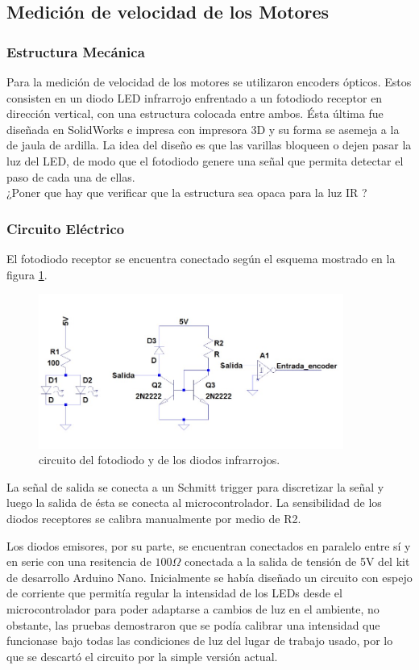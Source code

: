 \documentclass[10pt,conference,a4paper,onecolumn]{article}%
\begin{document}
\subsection{Medición de velocidad de los Motores}
\subsubsection{Estructura Mecánica}
Para la medición de velocidad de los motores se utilizaron encoders ópticos. Estos consisten en un diodo LED infrarrojo enfrentado a un fotodiodo receptor en dirección vertical, con una estructura colocada entre ambos. Ésta última fue diseñada en SolidWorks e impresa con impresora 3D y su forma se asemeja a la de jaula de ardilla. La idea del diseño es que las varillas bloqueen o dejen pasar la luz del LED, de modo que el fotodiodo genere una señal que permita detectar el paso de cada una de ellas.
\\
¿Poner que hay que verificar que la estructura sea opaca para la luz IR ?

\subsubsection{Circuito Eléctrico}
El fotodiodo receptor se encuentra conectado según el esquema mostrado en la figura \ref{fig:circuitoFotodiodo}.
\begin{figure}[h]
\centering
\includegraphics[width=10cm]{./imagenes/circuitoFotodiodo.jpeg}
\caption{circuito del fotodiodo y de los diodos infrarrojos.}
\label{fig:circuitoFotodiodo}
\end{figure}
La señal de salida se conecta a un Schmitt trigger para discretizar la señal y luego la salida de ésta se conecta al microcontrolador. La sensibilidad de los diodos receptores se calibra manualmente por medio de R2.

Los diodos emisores, por su parte, se encuentran conectados en paralelo entre sí y en serie con una resitencia de $100 \Omega$ conectada a la salida de tensión de 5V del kit de desarrollo Arduino Nano. Inicialmente se había diseñado un circuito con espejo de corriente que permitía regular la intensidad de los LEDs desde el microcontrolador para poder adaptarse a cambios de luz en el ambiente, no obstante, las pruebas demostraron que se podía calibrar una intensidad que funcionase bajo todas las condiciones de luz del lugar de trabajo usado, por lo que se descartó el circuito por la simple versión actual.
\end{document}
